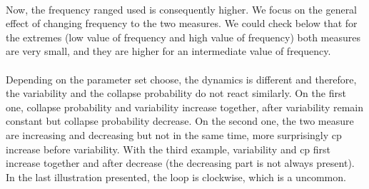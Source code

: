 \documentclass{article}
\begin{document}
\paragraph{}
Now, the frequency ranged used is consequently higher. We focus on the general effect of changing frequency to the two measures. We could check below that for the extremes (low value of frequency and high value of frequency) both measures are very small, and they are higher for an intermediate value of frequency.





\paragraph{}
Depending on the parameter set choose, the dynamics is different and therefore, the variability and the collapse probability do not react similarly. On the first one, collapse probability and variability increase together, after variability remain constant but collapse probability decrease. On the second one, the two measure are increasing and decreasing but not in the same time, more surprisingly cp increase before variability. With the third example, variability and cp first increase together and after decrease (the decreasing part is not always present). In the last illustration presented, the loop is clockwise, which is a uncommon.
\end{document}
